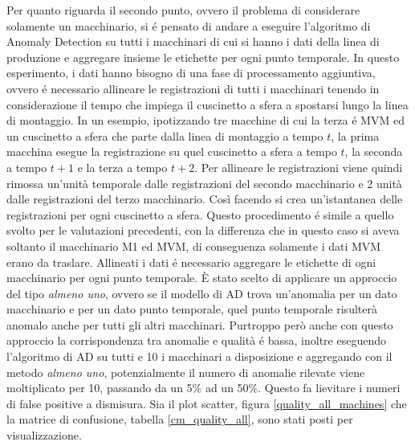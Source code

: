 \begin{table}[ht]
\centering
{}
\caption{\label{count-sopra-soglia-norm}Percentuale di cuscinetti sopra-soglia per intervallo}
\end{table}

Per quanto riguarda il secondo punto, ovvero il problema di considerare solamente un macchinario, si é pensato di andare a eseguire l'algoritmo di Anomaly Detection su tutti i macchinari di cui si hanno i dati della linea di produzione e aggregare insieme le etichette per ogni punto temporale.
In questo esperimento, i dati hanno bisogno di una fase di processamento aggiuntiva, ovvero é necessario allineare le registrazioni di tutti i macchinari tenendo in considerazione il tempo che impiega il cuscinetto a sfera a spostarsi lungo la linea di montaggio. In un esempio, ipotizzando tre macchine di cui la terza é MVM ed un cuscinetto a sfera che parte dalla linea di montaggio a tempo $t$, la prima macchina esegue la registrazione su quel cuscinetto a sfera a tempo $t$, la seconda a tempo $t+1$ e la terza a tempo $t+2$. Per allineare le registrazioni viene quindi rimossa un'unità temporale dalle registrazioni del secondo macchinario e 2 unità dalle registrazioni del terzo macchinario. Così facendo si crea un'istantanea delle registrazioni per ogni cuscinetto a sfera. Questo procedimento é simile a quello svolto per le valutazioni precedenti, con la differenza che in questo caso si aveva soltanto il macchinario M1 ed MVM, di conseguenza solamente i dati MVM erano da traslare.
Allineati i dati é necessario aggregare le etichette di ogni macchinario per ogni punto temporale. È stato scelto di applicare un approccio del tipo \textit{almeno uno}, ovvero se il modello di AD trova un'anomalia per un dato macchinario e per un dato punto temporale, quel punto temporale risulterà anomalo anche per tutti gli altri macchinari. 
Purtroppo però anche con questo approccio la corrispondenza tra anomalie e qualità é bassa, inoltre eseguendo l'algoritmo di AD su tutti e 10 i macchinari a disposizione e aggregando con il metodo \textit{almeno uno}, potenzialmente il numero di anomalie rilevate viene moltiplicato per 10, passando da un 5\% ad un 50\%. Questo fa lievitare i numeri di false positive a dismisura. Sia il plot scatter, figura \ref{quality_all_machines} che la matrice di confusione, tabella \ref{cm_quality_all}, sono stati posti per visualizzazione.

